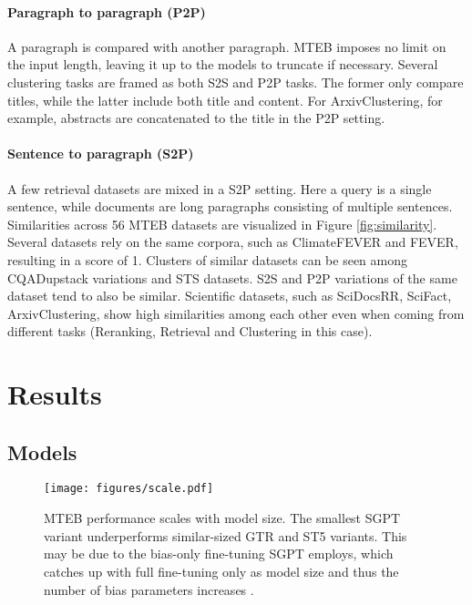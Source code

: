 \documentclass[11pt]{article}
\begin{document}
\paragraph{Paragraph to paragraph (P2P)} A paragraph is compared with another paragraph. MTEB imposes no limit on the input length, leaving it up to the models to truncate if necessary. Several clustering tasks are framed as both S2S and P2P tasks. The former only compare titles, while the latter include both title and content. For ArxivClustering, for example, abstracts are concatenated to the title in the P2P setting.

\paragraph{Sentence to paragraph (S2P)} A few retrieval datasets are mixed in a S2P setting. Here a query is a single sentence, while documents are long paragraphs consisting of multiple sentences.\\

Similarities across 56 MTEB datasets are visualized in Figure \ref{fig:similarity}. Several datasets rely on the same corpora, such as ClimateFEVER and FEVER, resulting in a score of 1. Clusters of similar datasets can be seen among CQADupstack variations and STS datasets. S2S and P2P variations of the same dataset tend to also be similar. Scientific datasets, such as SciDocsRR, SciFact, ArxivClustering, show high similarities among each other even when coming from different tasks (Reranking, Retrieval and Clustering in this case).

\section{Results}

\subsection{Models}

\begin{figure}[t]
    \centering
    \texttt{[image: figures/scale.pdf]}
    \caption{MTEB performance scales with model size. The smallest SGPT variant underperforms similar-sized GTR and ST5 variants. This may be due to the bias-only fine-tuning SGPT employs, which catches up with full fine-tuning only as model size and thus the number of bias parameters increases \cite{muennighoff2022sgpt}.}
    \label{fig:scale}
\end{figure}
\end{document}
